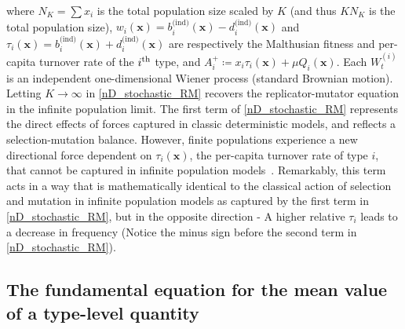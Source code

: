 where $N_K = \sum x_i$ is the total population size scaled by $K$ (and thus $KN_K$ is the total population size), $w_i(\mathbf{x}) = b^{\textrm{(ind)}}_{i}(\mathbf{x}) - d^{\textrm{(ind)}}_{i}(\mathbf{x})$ and $\tau_i(\mathbf{x}) = b^{\textrm{(ind)}}_{i}(\mathbf{x}) + d^{\textrm{(ind)}}_{i}(\mathbf{x})$ are respectively the Malthusian fitness and per-capita turnover rate of the $i\textsuperscript{th}$ type, and $A_i^{+} \coloneqq x_i\tau_i(\mathbf{x}) + \mu Q_i(\mathbf{x})$. Each $W^{(i)}_t$ is an independent one-dimensional Wiener process (standard Brownian motion). Letting $K \to \infty$  in \eqref{nD_stochastic_RM} recovers the replicator-mutator equation in the infinite population limit. The first term of \eqref{nD_stochastic_RM} represents the direct effects of forces captured in classic deterministic models, and reflects a selection-mutation balance. However, finite populations experience a new directional force dependent on $\tau_i(\mathbf{x})$, the per-capita turnover rate of type $i$, that cannot be captured in infinite population models~\citep{kuosmanen_turnover_2022}. Remarkably, this term acts in a way that is mathematically identical to the classical action of selection and mutation in infinite population models as captured by the first term in \eqref{nD_stochastic_RM}, but in the opposite direction - A higher relative $\tau_i$ leads to a decrease in frequency (Notice the minus sign before the second term in \eqref{nD_stochastic_RM}).
\subsection{The fundamental equation for the mean value of a type-level quantity}\label{sec_fun_theorems_mean}

